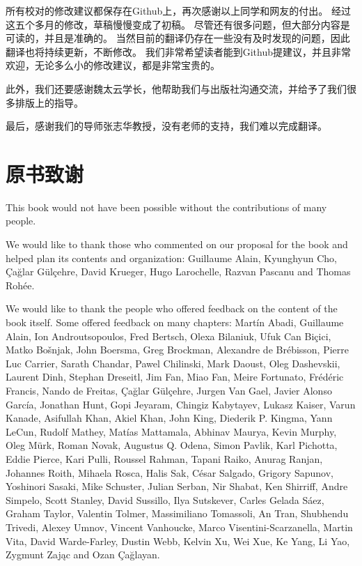 所有校对的修改建议都保存在Github上，再次感谢以上同学和网友的付出。
经过这五个多月的修改，草稿慢慢变成了初稿。
尽管还有很多问题，但大部分内容是可读的，并且是准确的。
当然目前的翻译仍存在一些没有及时发现的问题，因此翻译也将持续更新，不断修改。
我们非常希望读者能到Github提建议，并且非常欢迎，无论多么小的修改建议，都是非常宝贵的。

此外，我们还要感谢魏太云学长，他帮助我们与出版社沟通交流，并给予了我们很多排版上的指导。

最后，感谢我们的导师张志华教授，没有老师的支持，我们难以完成翻译。


\chapter*{原书致谢}
This book would not have been possible without the contributions of many people.

We would like to thank those who commented on our proposal for the book and helped plan its contents and organization:
Guillaume Alain, Kyunghyun Cho, \c{C}a\u{g}lar G\"ul\c{c}ehre, David Krueger, Hugo Larochelle, Razvan Pascanu and Thomas Roh\'ee.

We would like to thank the people who offered feedback on the content of the book itself. Some offered feedback on many chapters:
Mart\'in Abadi, Guillaume Alain, Ion Androutsopoulos, Fred Bertsch, Olexa Bilaniuk, Ufuk Can Biçici, Matko Bo\v{s}njak, John Boersma, Greg Brockman, Alexandre de Brébisson, Pierre Luc Carrier, Sarath Chandar, Pawel Chilinski, Mark Daoust, Oleg Dashevskii, Laurent Dinh, Stephan Dreseitl, Jim Fan, Miao Fan, Meire Fortunato, Fr\'ed\'eric Francis, Nando de Freitas, \c{C}a\u{g}lar G\"ul\c{c}ehre, Jurgen Van Gael, Javier Alonso Garc\'ia, Jonathan Hunt, Gopi Jeyaram, Chingiz Kabytayev, Lukasz Kaiser, Varun Kanade, Asifullah Khan, Akiel Khan, John King, Diederik P. Kingma, Yann LeCun, Rudolf Mathey, Matías Mattamala, Abhinav Maurya, Kevin Murphy, Oleg Mürk, Roman Novak, Augustus Q. Odena, Simon Pavlik, Karl Pichotta, Eddie Pierce, Kari Pulli, Roussel Rahman, Tapani Raiko, Anurag Ranjan, Johannes Roith, Mihaela Rosca, Halis Sak, César Salgado, Grigory Sapunov, Yoshinori Sasaki, Mike Schuster, Julian Serban, Nir Shabat, Ken Shirriff, Andre Simpelo, Scott Stanley, David Sussillo, Ilya Sutskever, Carles Gelada Sáez, Graham Taylor, Valentin Tolmer, Massimiliano Tomassoli, An Tran, Shubhendu Trivedi, Alexey Umnov, Vincent Vanhoucke, Marco Visentini-Scarzanella, Martin Vita, David Warde-Farley, Dustin Webb, Kelvin Xu, Wei Xue, Ke Yang, Li Yao, Zygmunt Zaj\k{a}c and Ozan \c{C}a\u{g}layan.

